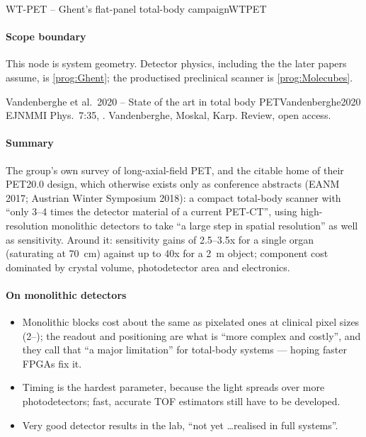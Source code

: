 \begin{programnote}{WT-PET -- Ghent's flat-panel total-body campaign}{WTPET}
\paragraph{Scope boundary}
This node is system geometry. Detector physics, including the  the
later papers assume, is \ref{prog:Ghent}; the productised preclinical
scanner is \ref{prog:Molecubes}.

\begin{papernote}{Vandenberghe et al.\ 2020 -- State of the art in total body PET}{Vandenberghe2020}
EJNMMI Phys.\ 7:35, . Vandenberghe, Moskal, Karp.
Review, open access.

\paragraph{Summary}
The group's own survey of long-axial-field PET, and the citable home of their
PET20.0 design, which otherwise exists only as conference abstracts (EANM 2017;
Austrian Winter Symposium 2018): a compact total-body scanner with ``only 3--4
times the detector material of a current PET-CT'', using high-resolution
monolithic detectors to take ``a large step in spatial resolution'' as well as
sensitivity. Around it: sensitivity gains of 2.5--3.5x for a single organ
(saturating at \qty{70}{\centi\metre}) against up to 40x for a \qty{2}{\metre}
object; component cost dominated by crystal volume, photodetector area and
electronics.

\paragraph{On monolithic detectors}
\begin{itemize}
	\item Monolithic blocks cost about the same as pixelated ones at clinical
		pixel sizes (2--); the readout and positioning are what is ``more
		complex and costly'', and they call that ``a major limitation'' for
		total-body systems --- hoping faster FPGAs fix it.
	\item Timing is the hardest parameter, because the light spreads over more
		photodetectors; fast, accurate TOF estimators still have to be
		developed.
	\item Very good detector results in the lab, ``not yet \ldots realised in
		full systems''.
\end{itemize}


\end{papernote}
\end{programnote}
